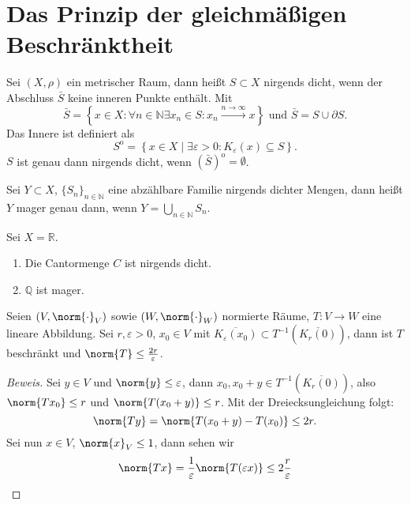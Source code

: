 \section{Das Prinzip der gleichmäßigen Beschränktheit}
\begin{definition}
	Sei $(X, \rho)$ ein metrischer Raum, dann heißt $S \subset X$ nirgends dicht, wenn der Abschluss $\bar{S}$ keine inneren Punkte enthält. Mit 
	\[
	\bar{S} = \left\{ x \in X : \forall n \in \mathbb{N} \exists x_n \in S: x_n \xrightarrow{n \to \infty} x \right\} \text{ und } \bar{S} = S \cup \partial S.
	\] 
	Das Innere ist definiert als 
	\[
	S^{\mathrm{o}} = \left\{ x \in X \mid \exists \varepsilon > 0: K_{\varepsilon}(x) \subseteq S \right\}.
	\] 
	$S$ ist genau dann nirgends dicht, wenn $(\bar{S})^{\mathrm{o}} = \emptyset$.
\end{definition}

\begin{definition}
	Sei $Y \subset X$, $\{S_n\}_{n \in \mathbb{N}}$ eine abzählbare Familie nirgends dichter Mengen, dann heißt $Y$ mager genau dann, wenn $Y = \bigcup_{n \in \mathbb{N}} S_n$.
\end{definition}

\begin{ex}
	Sei $X = \mathbb{R}$. 
	\begin{enumerate}
		\item Die Cantormenge $C$ ist nirgends dicht.
		\item $\mathbb{Q}$ ist mager.
	\end{enumerate}
\end{ex}

\begin{lemma} \label{lemma_glm_beschr}
	Seien $(V, \norm{\cdot}_V)$ sowie $(W, \norm{\cdot}_W)$ normierte Räume, $T: V \to W$ eine lineare Abbildung. Sei $r, \varepsilon > 0$, $x_0 \in V$ mit $\overline{K_{\varepsilon}(x_0)} \subset T^{-1}(\overline{K_r(0)})$, dann ist $T$ beschränkt und $\norm{T} \leq \frac{2r}{\varepsilon}$.
	
	\begin{proof}[Beweis] 
		Sei $y \in V$ und $\norm{y} \leq \varepsilon$, dann $x_0, x_0 + y \in T^{-1}(\overline{K_r(0)})$, also $\norm{Tx_0} \leq r$ und $\norm{T(x_0 + y)} \leq r$. Mit der Dreiecksungleichung folgt: 
		\[
		\norm{Ty} = \norm{T(x_0 + y) - T(x_0)} \leq 2r.
		\] 
		Sei nun $x \in V$, $\norm{x}_V \leq 1$, dann sehen wir 
		\[
		\norm{Tx} = \frac{1}{\varepsilon} \norm{T(\varepsilon x)} \leq 2 \frac{r}{\varepsilon}
		\]
	\end{proof}
\end{lemma}

